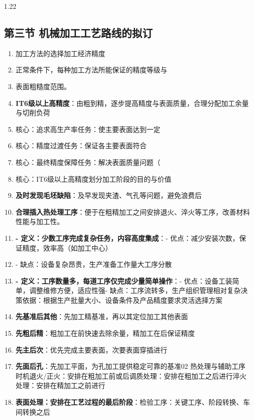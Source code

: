 \documentclass[12pt,a4paper]{article}
\begin{document}
\begin{spacing}{1.22}
\subsection{第三节 机械加工工艺路线的拟订}
\begin{tcolorbox}[colback=yellow!6,colframe=red!55!black,title=重点,left=1mm,right=1mm]
\begin{enumerate}[leftmargin=2.2em,label=\arabic*.]
  \item 加工方法的选择加工经济精度
  \item 正常条件下，每种加工方法所能保证的精度等级与
  \item 表面粗糙度范围。
  \item \textbf{IT6级以上高精度}：由粗到精，逐步提高精度与表面质量，合理分配加工余量与切削负荷
  \item 核心：追求高生产率任务：使主要表面达到一定
  \item 核心：精度过渡任务：保证各主要表面符合
  \item 核心：最终精度保障任务：解决表面质量问题（
  \item 核心：IT6级以上高精度划分加工阶段的目的与价值
  \item \textbf{及时发现毛坯缺陷}：及早发现夹渣、气孔等问题，避免浪费后
  \item \textbf{合理插入热处理工序}：便于在粗精加工之间安排退火、淬火等工序，改善材料性能与加工性。
  \item \textbf{- 定义：少数工序完成复杂任务，内容高度集成}：- 优点：减少安装次数，保证精度，效率高（如加工中心）
  \item - 缺点：设备复杂昂贵，生产准备工作量大工序分散
  \item \textbf{- 定义：工序数量多，每道工序仅完成少量简单操作}：- 优点：设备工装简单，调整维修方便，适应性强- 缺点：工序流转多，生产组织管理相对复杂决策依据：根据生产批量大小、设备条件及产品精度要求灵活选择方案
  \item \textbf{先基准后其他}：先加工精基准，再以其定位加工其他表面
  \item \textbf{先粗后精}：粗加工在前快速去除余量，精加工在后保证精度
  \item \textbf{先主后次}：优先完成主要表面，次要表面穿插进行
  \item \textbf{先面后孔}：先加工平面，为孔加工提供稳定可靠的基准02 热处理与辅助工序时机退火/正火：安排在粗加工前或后调质处理：安排在粗加工之后进行淬火处理：安排在精加工之前进行
  \item \textbf{表面处理：安排在工艺过程的最后阶段}：检验工序：关键工序、阶段转换、车间转换之后
\end{enumerate}

\end{tcolorbox}
\end{spacing}
\end{document}
